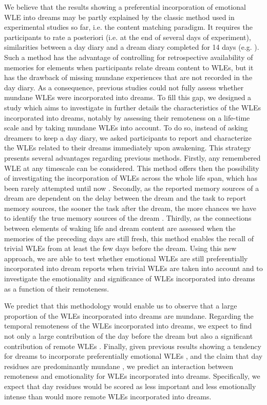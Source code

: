 We believe that the results showing a preferential incorporation of emotional WLE into dreams may be partly explained by the classic method used in experimental studies so far, i.e. the content matching paradigm. It requires the participants to rate a posteriori (i.e. at the end of several days of experiment), similarities between a day diary and a dream diary completed for 14 days (e.g. \citealp{schredl_factors_2006, malinowski_evidence_2014}). Such a method has the advantage of controlling for retrospective availability of memories for elements when participants relate dream content to WLEs, but it has the drawback of missing mundane experiences that are not recorded in the day diary. As a consequence, previous studies could not fully assess whether mundane WLEs were incorporated into dreams. To fill this gap, we designed a study which aims to investigate in further details the characteristics of the WLEs incorporated into dreams, notably by assessing their remoteness on a life-time scale and by taking mundane WLEs into account. To do so, instead of asking dreamers to keep a day diary, we asked participants to report and characterize the WLEs related to their dreams immediately upon awakening. This strategy presents several advantages regarding previous methods. Firstly, any remembered WLE at any timescale can be considered. This method offers then the possibility of investigating the incorporation of WLEs across the whole life span, which has been rarely attempted until now \citep{grenier_temporal_2005, marquardt_empirical_1996}. Secondly, as the reported memory sources of a dream are dependent on the delay between the dream and the task to report memory sources, the sooner the task after the dream, the more chances we have to identify the true memory sources of the dream \citep{cavallero_dream_1987}. Thirdly, as the connections between elements of waking life and dream content are assessed when the memories of the preceding days are still fresh, this method enables the recall of trivial WLEs from at least the few days before the dream. Using this new approach, we are able to test whether emotional WLEs are still preferentially incorporated into dream reports when trivial WLEs are taken into account and to investigate the emotionality and significance of WLEs incorporated into dreams as a function of their remoteness.

We predict that this methodology would enable us to observe that a large proportion of the WLEs incorporated into dreams are mundane. Regarding the temporal remoteness of the WLEs incorporated into dreams, we expect to find not only a large contribution of the day before the dream \citep{marquardt_empirical_1996} but also a significant contribution of remote WLEs \citep{verdone_temporal_1965, grenier_temporal_2005, llewellyn_such_2013}. Finally, given previous results showing a tendency for dreams to incorporate preferentially emotional WLEs \citealp{schredl_factors_2006, malinowski_evidence_2014}, and the claim that day residues are predominantly mundane \citep{freud_interpretation_1900}, we predict an interaction between remoteness and emotionality for WLEs incorporated into dreams. Specifically, we expect that day residues would be scored as less important and less emotionally intense than would more remote WLEs incorporated into dreams.


